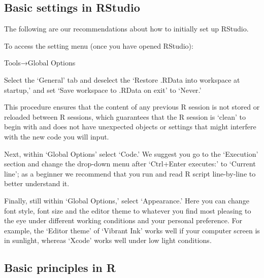 \documentclass[
]{book}
\begin{document}
\hypertarget{RS-settings}{%
\subsection{Basic settings in RStudio}\label{RS-settings}}

The following are our recommendations about how to initially set up
RStudio.

To access the setting menu (once you have opened RStudio):

Tools→Global Options

Select the `General' tab and deselect the `Restore .RData into workspace
at startup,' and set `Save workspace to .RData on exit' to `Never.'

This procedure ensures that the content of any previous R session is not
stored or reloaded between R sessions, which guarantees that the R
session is `clean' to begin with and does not have unexpected objects or
settings that might interfere with the new code you will input.

Next, within `Global Options' select `Code.' We suggest you go to the
`Execution' section and change the drop-down menu after `Ctrl+Enter
executes:' to `Current line'; as a beginner we recommend that you run
and read R script line-by-line to better understand it.

Finally, still within `Global Options,' select `Appearance.' Here you
can change font style, font size and the editor theme to whatever you
find most pleasing to the eye under different working conditions and
your personal preference. For example, the `Editor theme' of `Vibrant
Ink' works well if your computer screen is in sunlight, whereas `Xcode'
works well under low light conditions.

\hypertarget{Principles}{%
\subsection{Basic principles in R}\label{Principles}}
\end{document}
